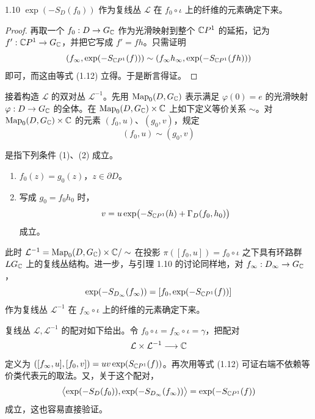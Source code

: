 
\begin{lemma*}{1.10}
$\exp(-S_D(f_0))$ 作为复线丛 $\mathcal{L}$ 在 $f_0\circ\iota$ 上的纤维的元素确定下来。
\end{lemma*}

\begin{proof}
再取一个 $f_0:D\to G_{\mathbb{C}}$ 作为光滑映射到整个 $\mathbb{C}P^1$ 的延拓，记为 $f':\mathbb{C}P^1\to G_{\mathbb{C}}$，并把它写成 $f'=fh$。只需证明
\[
  (f_\infty,\exp(-S_{\mathbb{C}P^1}(f)))\sim(f_\infty h_\infty,\exp(-S_{\mathbb{C}P^1}(fh)))
\]
即可，而这由等式 (1.12) 立得。于是断言得证。
\end{proof}

接着构造 $\mathcal{L}$ 的双对丛 $\mathcal{L}^{-1}$。先用 $\operatorname{Map}_0(D,G_{\mathbb{C}})$ 表示满足 $\varphi(0)=e$ 的光滑映射 $\varphi:D\to G_{\mathbb{C}}$ 的全体。在 $\operatorname{Map}_0(D,G_{\mathbb{C}})\times\mathbb{C}$ 上如下定义等价关系 $\sim$。对 $\operatorname{Map}_0(D,G_{\mathbb{C}})\times\mathbb{C}$ 的元素 $(f_0,u)$、$(g_0,v)$，规定
\[
  (f_0,u)\sim(g_0,v)
\]

是指下列条件 (1)、(2) 成立。
\begin{enumerate}[label=(\arabic*),leftmargin=2.2em,itemsep=3pt]
  \item $f_0(z)=g_0(z)$，$z\in\partial D$。
  \item 写成 $g_0=f_0h_0$ 时，
  \[
    v=u\exp\bigl(-S_{\mathbb{C}P^1}(h)+\Gamma_D(f_0,h_0)\bigr)
  \]
  成立。
\end{enumerate}

此时 $\mathcal{L}^{-1}=\operatorname{Map}_0(D,G_{\mathbb{C}})\times\mathbb{C}/\sim$ 在投影 $\pi([f_0,u])=f_0\circ\iota$ 之下具有环路群 $LG_{\mathbb{C}}$ 上的复线丛结构。进一步，与引理 1.10 的讨论同样地，对 $f_\infty:D_\infty\to G_{\mathbb{C}}$，
\[
  \exp(-S_{D_\infty}(f_\infty))=[f_0,\exp(-S_{\mathbb{C}P^1}(f))]
\]
作为复线丛 $\mathcal{L}^{-1}$ 在 $f_\infty\circ\iota$ 上的纤维的元素确定下来。

复线丛 $\mathcal{L},\mathcal{L}^{-1}$ 的配对如下给出。令 $f_0\circ\iota=f_\infty\circ\iota=\gamma$，把配对
\[
  \mathcal{L}\times\mathcal{L}^{-1}\longrightarrow\mathbb{C}
\]
定义为 $([f_\infty,u],[f_0,v])=uv\exp(S_{\mathbb{C}P^1}(f))$。再次用等式 (1.12) 可证右端不依赖等价类代表元的取法。又，关于这个配对，
\[
  \bigl\langle\exp(-S_D(f_0)),\exp(-S_{D_\infty}(f_\infty))\bigr\rangle=\exp(-S_{\mathbb{C}P^1}(f))
\]
成立，这也容易直接验证。


